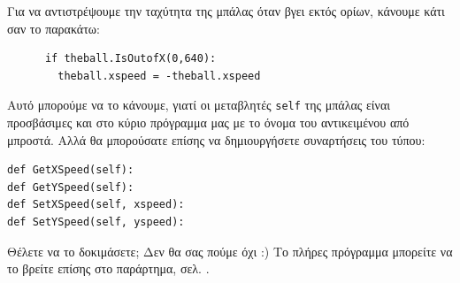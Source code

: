 Για να αντιστρέψουμε την ταχύτητα της μπάλας όταν βγει εκτός ορίων,
κάνουμε κάτι σαν το παρακάτω:

\begin{verbatim}
      if theball.IsOutofX(0,640):
        theball.xspeed = -theball.xspeed
\end{verbatim}

Αυτό μπορούμε να το κάνουμε, γιατί οι μεταβλητές {\tt self} της μπάλας είναι
προσβάσιμες και στο κύριο πρόγραμμα μας με το όνομα του αντικειμένου από
μπροστά. Αλλά θα μπορούσατε επίσης να δημιουργήσετε συναρτήσεις του
τύπου:

\begin{verbatim}
def GetXSpeed(self):
def GetYSpeed(self):
def SetXSpeed(self, xspeed):
def SetYSpeed(self, yspeed):
\end{verbatim}

Θέλετε να το δοκιμάσετε; Δεν θα σας πούμε όχι :)
Το πλήρες πρόγραμμα μπορείτε να το βρείτε επίσης στο παράρτημα, σελ. \pageref{listing:bouncing-ball-oop}.
